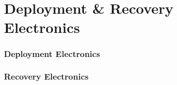 \part{Deployment \& Recovery Electronics}

\section{Deployment Electronics}

\section{Recovery Electronics}
